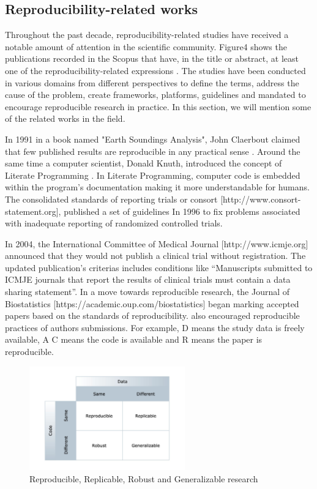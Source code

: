 \subsection{Reproducibility-related works}
Throughout the past decade, reproducibility-related studies have received a notable amount of attention in the 
scientific community. Figure4 shows the publications recorded in the Scopus that have, in the title or abstract, 
at least one of the reproducibility-related expressions \cite{goodman_what_2016}. The studies have been conducted in 
various domains from different perspectives to define the terms, address the cause of the problem, create frameworks, 
platforms, guidelines and mandated to encourage reproducible research in practice. In this section, we will mention 
some of the related works in the field.

In 1991 in a book named "Earth Soundings Analysis", John Claerbout claimed that few published results are reproducible 
in any practical sense \cite{claerbout_earth_1992}. Around the same time a computer scientist, Donald Knuth, introduced 
the concept of Literate Programming \cite{knuth_literate_1984}. In Literate Programming, computer code is embedded within 
the program's documentation making it more understandable for humans. The consolidated standards of reporting trials 
or consort [http://www.consort-statement.org], published a set of guidelines In 1996 to fix problems associated 
with inadequate reporting of randomized controlled trials.

In 2004, the International Committee of Medical Journal [http://www.icmje.org] announced that they would not publish a 
clinical trial without registration. The updated publication's criterias includes conditions like 
“Manuscripts submitted to ICMJE journals that report the results of clinical trials must contain a data sharing statement”. 
In a move towards reproducible research, the Journal of Biostatistics [https://academic.oup.com/biostatistics] began 
marking accepted papers based on the standards of reproducibility. also encouraged reproducible practices of authors 
submissions. For example, D means the study data is freely available, A C means the code is available and R means the 
paper is reproducible. 

\begin{figure}[ht]
    \centering
    \includegraphics[width=0.60\textwidth]{figures/01ReproducibleReplicable.jpg}
    \caption{Reproducible, Replicable, Robust and Generalizable research \cite{whitaker_showing_2017}}
    \label{fig:ReproducibleReplicable}
\end{figure}

